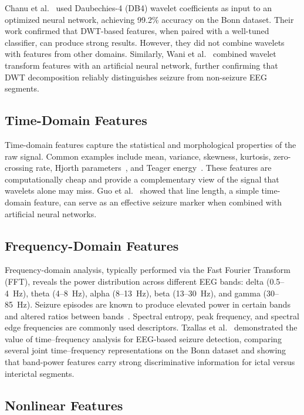 Chanu et al.~\citep{chanu2023automated} used Daubechies-4 (DB4) wavelet coefficients as input to an optimized neural network, achieving 99.2\% accuracy on the Bonn dataset. Their work confirmed that DWT-based features, when paired with a well-tuned classifier, can produce strong results. However, they did not combine wavelets with features from other domains. Similarly, Wani et al.~\citep{wani2019detection} combined wavelet transform features with an artificial neural network, further confirming that DWT decomposition reliably distinguishes seizure from non-seizure EEG segments.

\subsection{Time-Domain Features}

Time-domain features capture the statistical and morphological properties of the raw signal. Common examples include mean, variance, skewness, kurtosis, zero-crossing rate, Hjorth parameters~\citep{hjorth1970eeg}, and Teager energy~\citep{kaiser1990simple}. These features are computationally cheap and provide a complementary view of the signal that wavelets alone may miss. Guo et al.~\citep{guo2010automatic} showed that line length, a simple time-domain feature, can serve as an effective seizure marker when combined with artificial neural networks.

\subsection{Frequency-Domain Features}

Frequency-domain analysis, typically performed via the Fast Fourier Transform (FFT), reveals the power distribution across different EEG bands: delta (0.5--4~Hz), theta (4--8~Hz), alpha (8--13~Hz), beta (13--30~Hz), and gamma (30--85~Hz). Seizure episodes are known to produce elevated power in certain bands and altered ratios between bands~\citep{subasi2019epileptic}. Spectral entropy, peak frequency, and spectral edge frequencies are commonly used descriptors. Tzallas et al.~\citep{tzallas2009epileptic} demonstrated the value of time--frequency analysis for EEG-based seizure detection, comparing several joint time--frequency representations on the Bonn dataset and showing that band-power features carry strong discriminative information for ictal versus interictal segments.

\subsection{Nonlinear Features}

